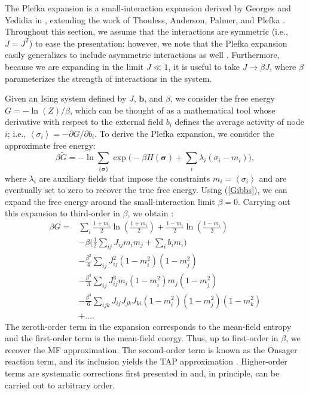 \documentclass[letterpaper]{article} %
\begin{document}
The Plefka expansion is a small-interaction expansion derived by Georges and Yedidia in \cite{Georges-01}, extending the work of Thouless, Anderson, Palmer, and Plefka \cite{Thouless-01,Plefka-01}. Throughout this section, we assume that the interactions are symmetric (i.e., $J = J^T$) to ease the presentation; however, we note that the Plefka expansion easily generalizes to include asymmetric interactions as well \cite{Lynn-01,Zeng-01}. Furthermore, because we are expanding in the limit $J\ll 1$, it is useful to take $J\rightarrow \beta J$, where $\beta$ parameterizes the strength of interactions in the system. 

Given an Ising system defined by $J$, $\bm{b}$, and $\beta$, we consider the free energy $G = -\ln (Z)/\beta$, which can be thought of as a mathematical tool whose derivative with respect to the external field $b_i$ defines the average activity of node $i$; i.e., $\left<\sigma_i\right> = -\partial G/\partial b_i$.
To derive the Plefka expansion, we consider the approximate free energy:
\begin{equation}
\label{Gibbs}
\beta \tilde{G} = -\ln\sum_{\{\bm{\sigma}\}} \exp\Big(-\beta H(\bm{\sigma}) + \sum_i \lambda_i (\sigma_i-m_i)\Big),
\end{equation}
where $\lambda_i$ are auxiliary fields that impose the constraints $m_i=\left<\sigma_i\right>$ and are eventually set to zero to recover the true free energy. Using (\ref{Gibbs}), we can expand the free energy around the small-interaction limit $\beta=0$. Carrying out this expansion to third-order in $\beta$, we obtain \cite{Yedidia-01}:
\begin{align}
\label{Expansion}
\beta G = &\sum_i \frac{1+m_i}{2}\ln\left(\frac{1+m_i}{2}\right) + \frac{1-m_i}{2}\ln\left(\frac{1-m_i}{2}\right) \nonumber \\
&-\beta\Big(\frac{1}{2} \sum_{ij} J_{ij}m_im_j + \sum_i b_i m_i\Big) \nonumber \\
&-\frac{\beta^2}{4}\sum_{ij} J_{ij}^2(1-m_i^2)(1-m_j^2) \nonumber \\
&-\frac{\beta^3}{3}\sum_{ij} J_{ij}^3 m_i(1-m_i^2)m_j(1-m_j^2) \nonumber \\
&- \frac{\beta^3}{6}\sum_{ijk} J_{ij}J_{jk}J_{ki}(1-m_i^2)(1-m_j^2)(1-m_k^2) \nonumber \\
&+ \hdots.
\end{align}
The zeroth-order term in the expansion corresponds to the mean-field entropy and the first-order term is the mean-field energy. Thus, up to first-order in $\beta$, we recover the MF approximation. The second-order term is known as the Onsager reaction term, and its inclusion yields the TAP approximation \cite{Thouless-01}. Higher-order terms are systematic corrections first presented in \cite{Georges-01} and, in principle, can be carried out to arbitrary order.
\end{document}
